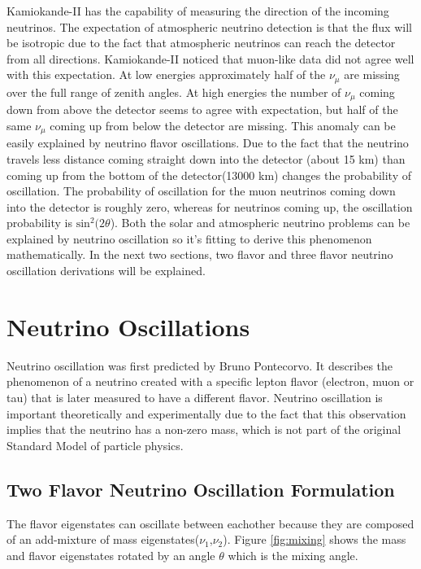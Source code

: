 Kamiokande-II has the capability of measuring the direction of the incoming neutrinos. The expectation of atmospheric neutrino detection is that the flux will be isotropic due to the fact that atmospheric neutrinos can reach the detector from all directions. Kamiokande-II noticed that muon-like data did not agree well with this expectation. At low energies approximately half of the $\nu_{\mu}$ are missing over the full range of zenith angles. At high energies the number of $\nu_{\mu}$ coming down from above the detector seems to agree with expectation, but half of the same $\nu_{\mu}$ coming up from below the detector are missing. This anomaly can be easily explained by neutrino flavor oscillations. Due to the fact that the neutrino travels less distance coming straight down into the detector (about 15 km) than coming up from the bottom of the detector(13000 km) changes the probability of oscillation. The probability of oscillation for the muon neutrinos coming down into the detector is roughly zero, whereas for neutrinos coming up, the oscillation probability is $\text{sin}^2(2\theta$). Both the solar and atmospheric neutrino problems can be explained by neutrino oscillation so it's fitting to derive this phenomenon mathematically. In the next two sections, two flavor and three flavor neutrino oscillation derivations will be explained. 


\section{Neutrino Oscillations}
Neutrino oscillation was first predicted by Bruno Pontecorvo. It describes the phenomenon of a neutrino created with a specific lepton flavor (electron, muon or tau) that is later measured to have a different flavor. Neutrino oscillation is important theoretically and experimentally due to the fact that this observation implies that the neutrino has a non-zero mass, which is not part of the original Standard Model of particle physics. \cite{neutrinooscillation} 

\subsection{Two Flavor Neutrino Oscillation Formulation}
The flavor eigenstates can oscillate between eachother because they are composed of an add-mixture of mass eigenstates($\nu_{1}$,$\nu_{2}$). Figure \ref{fig:mixing} shows the mass and flavor eigenstates rotated by an angle $\theta$ which is the mixing angle. 

